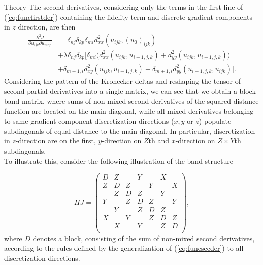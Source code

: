 \begin{chapter}{Theory}
The second derivatives, considering only the terms in the first line of (\ref{eq:funcfirstder}) containing the fidelity term and discrete gradient components in $z$ direction, are then
\begin{align}
    \label{eq:funcsecder}
    \frac{\partial^2 J}{\partial u_{ijk}\partial u_{mnp}} &=  \delta_{nj}\delta_{kp}\delta_{mi}d^2_{xx}(u_{ijk},(u_0)_{ijk}) \\
    &+\lambda\delta_{nj}\delta_{kp}
    \bigg[ 
	\delta_{mi} \bigg(d_{xx}^2(u_{ijk},u_{i+1,j,k}) +d_{yy}^2(u_{ijk},u_{i+1,j,k}) \bigg)\\
    &+  \delta_{m-1,i}d_{xy}^2(u_{ijk},u_{i+1,j,k}) +\delta_{m+1,i} d_{yy}^2(u_{i-1,j,k},u_{ijk})
    \bigg].
\end{align}
Considering the pattern of the Kronecker deltas and reshaping the tensor of second partial derivatives into a single matrix, we can see that we 
obtain a block band matrix, where sums of non-mixed second derivatives of the squared distance function are located on the main diagonal, while all mixed
derivatives belonging to same gradient component discretization directions ($x,y$ or $z$) populate subdiagonals of equal distance to the main diagonal.
In particular, discretization in $z$-direction are on the first, $y$-direction on $Z$th and $x$-direction on $Z\times Y$th subdiagonals.\\

To illustrate this, consider the following illustration of the band structure

\begin{equation}
    HJ=
\begin{pmatrix}
D	& Z	    & 		& Y	    & 		& X	    & 	   \\
Z	& D	    & Z		& 	    & Y		& 	    & X	  \\
	& Z	    & D	    & Z	    & 		& Y	    & 	 \\
Y	& 	    & Z		& D	    & Z		& 	    & Y	\\
	& Y	    & 		& Z	    & D		& Z	    & 	\\
X	& 	    & Y		& 	    & Z		& D	    & Z	\\
	& X	    & 		& Y	    & 		& Z	    & D	\\
\end{pmatrix},
\end{equation}
where $D$ denotes a block, consisting of the sum of non-mixed second derivatives, according to the rules defined by the generalization of (\ref{eq:funcsecder}) to all 
discretization directions.\\


\end{chapter}
